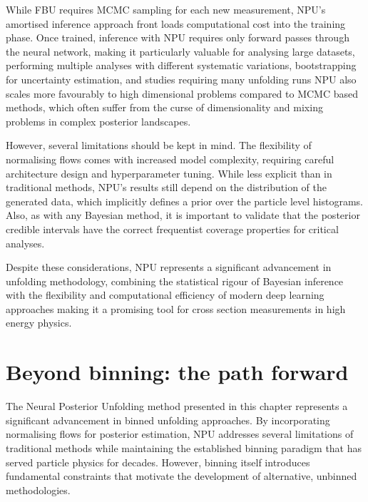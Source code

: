     While FBU requires MCMC sampling for each new measurement, NPU's amortised inference approach front loads computational cost into the training phase.
    Once trained, inference with NPU requires only forward passes through the neural network, making it particularly valuable for analysing large datasets, performing multiple analyses with different systematic variations, bootstrapping for uncertainty estimation, and studies requiring many unfolding runs
    NPU also scales more favourably to high dimensional problems compared to MCMC based methods, which often suffer from the curse of dimensionality and mixing problems in complex posterior landscapes.
    
    However, several limitations should be kept in mind.
    The flexibility of normalising flows comes with increased model complexity, requiring careful architecture design and hyperparameter tuning.
    While less explicit than in traditional methods, NPU's results still depend on the distribution of the generated data, which implicitly defines a prior over the particle level histograms.
    Also, as with any Bayesian method, it is important to validate that the posterior credible intervals have the correct frequentist coverage properties for critical analyses.
    
    Despite these considerations, NPU represents a significant advancement in unfolding methodology, combining the statistical rigour of Bayesian inference with the flexibility and computational efficiency of modern deep learning approaches making it a promising tool for cross section measurements in high energy physics.

\section{Beyond binning: the path forward}
    The Neural Posterior Unfolding method presented in this chapter represents a significant advancement in binned unfolding approaches.
    By incorporating normalising flows for posterior estimation, NPU addresses several limitations of traditional methods while maintaining the established binning paradigm that has served particle physics for decades.
    However, binning itself introduces fundamental constraints that motivate the development of alternative, unbinned methodologies.

